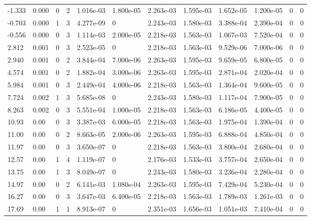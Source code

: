 \documentclass[preview]{standalone}
\begin{document}
{{\begin{tabular}{L{1.2cm}C{1.2cm} C{0.3cm}C{0.5cm} C{1.4cm}C{1.4cm} C{1.4cm}C{1.4cm} C{1.6cm}C{1.6cm} C{1.6cm}C{1.6cm}}
  -1.333  &  0.000  & 0     &  2 &  1.016e-03  & 1.800e-05  &  2.263e-03&   1.595e-03& 1.652e-05 & 1.200e-05   &  0 & 0  \\ 
  -0.703  &  0.000  & 1     &  3 &  4.277e-09  & 0  &  2.243e-03&   1.580e-03& 3.388e-04 & 2.390e-04   &  0 & 0  \\ 
  -0.556  &  0.000  & 0     &  3 &  1.114e-03  & 2.000e-05  &  2.218e-03&   1.563e-03& 1.067e-03 & 7.520e-04   &  0 & 0  \\ 
  2.812  &  0.001  & 0     &  3 &  2.523e-05  & 0  &  2.218e-03&   1.563e-03& 9.529e-06 & 7.000e-06   &  0 & 0  \\ 
  2.940  &  0.001  & 0     &  2 &  3.844e-04  & 7.000e-06  &  2.263e-03&   1.595e-03& 9.659e-05 & 6.800e-05   &  0 & 0  \\ 
  4.574  &  0.001  & 0     &  2 &  1.882e-04  & 3.000e-06  &  2.263e-03&   1.595e-03& 2.871e-04 & 2.020e-04   &  0 & 0  \\ 
  5.984  &  0.001  & 0     &  3 &  2.449e-04  & 4.000e-06  &  2.218e-03&   1.563e-03& 1.364e-04 & 9.600e-05   &  0 & 0  \\ 
  7.724  &  0.002  & 1     &  3 &  5.685e-08  & 0  &  2.243e-03&   1.580e-03& 1.117e-04 & 7.900e-05   &  0 & 0  \\ 
  8.263  &  0.002  & 0     &  3 &  5.551e-04  & 1.000e-05  &  2.218e-03&   1.563e-03& 6.186e-05 & 4.400e-05   &  0 & 0  \\ 
  10.93  &  0.00  & 0     &  3 &  3.387e-03  & 6.000e-05  &  2.218e-03&   1.563e-03& 1.975e-04 & 1.390e-04   &  0 & 0  \\ 
  11.00  &  0.00  & 0     &  2 &  8.663e-05  & 2.000e-06  &  2.263e-03&   1.595e-03& 6.888e-04 & 4.850e-04   &  0 & 0  \\ 
  11.97  &  0.00  & 0     &  3 &  3.650e-07  & 0  &  2.218e-03&   1.563e-03& 3.800e-04 & 2.680e-04   &  0 & 0  \\ 
  12.57  &  0.00  & 1     &  4 &  1.119e-07  & 0  &  2.176e-03&   1.533e-03& 3.757e-04 & 2.650e-04   &  0 & 0  \\ 
  13.75  &  0.00  & 1     &  3 &  8.049e-07  & 0  &  2.243e-03&   1.580e-03& 3.236e-04 & 2.280e-04   &  0 & 0  \\ 
  14.97  &  0.00  & 0     &  2 &  6.141e-03  & 1.080e-04  &  2.263e-03&   1.595e-03& 7.429e-04 & 5.230e-04   &  0 & 0  \\ 
  16.27  &  0.00  & 0     &  3 &  3.647e-03  & 6.400e-05  &  2.218e-03&   1.563e-03& 1.789e-03 & 1.261e-03   &  0 & 0  \\ 
  17.69  &  0.00  & 1     &  1 &  8.913e-07  & 0  &  2.351e-03&   1.656e-03& 1.051e-03 & 7.410e-04   &  0 & 0  \\ 

\end{tabular}}}
\end{document}

